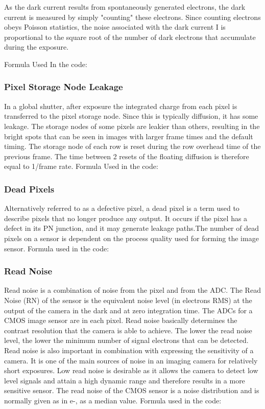 \documentclass[../../main.tex]{subfiles}
\begin{document}
As the dark current results from spontaneously generated electrons, the dark current is measured by simply "counting" these electrons. Since counting electrons obeys Poisson statistics, the noise associated with the dark current I is proportional to the square root of the number of dark electrons that accumulate during the exposure. 

Formula Used In the code:  


\subsubsection{Pixel Storage Node Leakage} %
In a global shutter, after exposure the integrated charge from each pixel is transferred to the pixel storage node. Since this is typically diffusion, it has some leakage. The storage nodes of some pixels are leakier than others, resulting in the bright spots that can be seen in images with larger frame times and the default timing.
The storage node of each row is reset during the row overhead time of the previous frame. The time between 2 resets of the floating diffusion is therefore equal to 1/frame rate.
Formula Used in the code:


\subsubsection{Dead Pixels} %
Alternatively referred to as a defective pixel, a dead pixel is a term used to describe pixels that no longer produce any output. It occurs if the pixel has a defect in its PN junction, and it may generate leakage paths.The number of dead pixels on a sensor is dependent on the process quality used for forming the image sensor.
Formula used in the code:


\subsubsection{Read Noise} %
Read noise is a combination of noise from the pixel and from the ADC. The Read Noise (RN) of the sensor is the equivalent noise level (in electrons RMS) at the output of the camera in the dark and at zero integration time. The ADCs for a CMOS image sensor are in each pixel.
Read noise basically determines the contrast resolution that the camera is able to achieve. The lower the read noise level, the lower the minimum number of signal electrons that can be detected. Read noise is also important in combination with expressing the sensitivity of a camera. 
It is one of the main sources of noise in an imaging camera for relatively short exposures. Low read noise is desirable as it allows the camera to detect low level signals and attain a high dynamic range and therefore results in a more sensitive sensor.
The read noise of the CMOS sensor is a noise distribution and is normally given as in e-, as a median value.
Formula used in the code:
\end{document}
